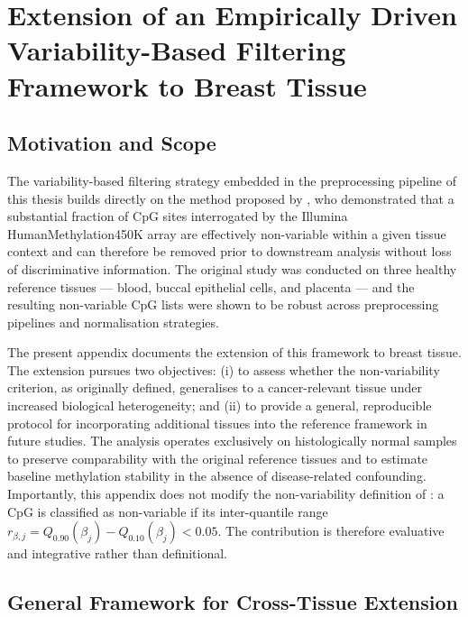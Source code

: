 \chapter{Extension of an Empirically Driven Variability-Based Filtering Framework to Breast Tissue}
\label{app:empirical_variability_extension}

\section{Motivation and Scope}

The variability-based filtering strategy embedded in the preprocessing 
pipeline of this thesis builds directly on the method proposed 
by \cite{Edgar2017}, who demonstrated that a substantial fraction 
of CpG sites interrogated by the Illumina HumanMethylation450K array 
are effectively non-variable within a given tissue context and can 
therefore be removed prior to downstream analysis without loss of 
discriminative information. The original study was conducted on three 
healthy reference tissues — blood, buccal epithelial cells, and 
placenta — and the resulting non-variable CpG lists were shown to be 
robust across preprocessing pipelines and normalisation strategies.

The present appendix documents the extension of this framework to 
breast tissue. The extension pursues two objectives: (i) to assess 
whether the non-variability criterion, as originally defined, 
generalises to a cancer-relevant tissue under increased biological 
heterogeneity; and (ii) to provide a general, reproducible protocol 
for incorporating additional tissues into the reference framework 
in future studies. The analysis operates exclusively on 
histologically normal samples to preserve comparability with the 
original reference tissues and to estimate baseline methylation 
stability in the absence of disease-related confounding.
Importantly, this appendix does not modify the non-variability 
definition of \cite{Edgar2017}: a CpG is classified as non-variable 
if its inter-quantile range $r_{\beta,j} = Q_{0.90}(\beta_j) - 
Q_{0.10}(\beta_j) < 0.05$. The contribution is therefore evaluative and integrative rather than definitional.

\section{General Framework for Cross-Tissue Extension}
\label{app:sec:framework}


